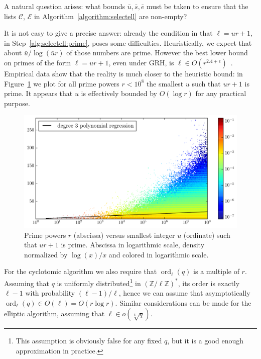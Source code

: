 \documentclass[12pt]{article}
\theoremstyle{plain}
\theoremstyle{definition}
\DeclareMathOperator{\order}{ord} %
\def\Z{\ensuremath{\mathbb{Z}}}
\newcounter{algorithm}
\begin{document}
A natural question arises: what bounds $\bar{u},\bar{s},\bar{e}$ must
be taken to ensure that the lists $\mathcal{C}$, $\mathcal{E}$ in
Algorithm~\ref{algorithm:selectell} are non-empty?

It is not easy to give a precise answer: already the condition in that
$\ell=ur+1$, in Step~\ref{alg:selectell:prime}, poses some
difficulties. Heuristically, we expect that about
$\bar{u}/\log(\bar{u}r)$ of those numbers are prime. However the best
lower bound on primes of the form $\ell=ur+1$, even under GRH, is
$\ell\in O(r^{2.4+\epsilon})$~\cite{heath1992zero}. Empirical data
show that the reality is much closer to the heuristic bound: in
Figure~\ref{fig:primes-arith-prog} we plot for all prime powers
$r<10^8$ the smallest $u$ such that $ur+1$ is prime. It appears that
$u$ is effectively bounded by $O(\log r)$ for any practical purpose.


\begin{figure}
  \centering
  \includegraphics[width=\textwidth]{arith_prog}  
  \caption{Prime powers $r$ (abscissa) versus smallest integer $u$
    (ordinate) such that $ur+1$ is prime. Abscissa in logarithmic
    scale, density normalized by $\log(x)/x$ and colored in
    logarithmic scale.}
  \label{fig:primes-arith-prog}
\end{figure}

For the cyclotomic algorithm we also require that $\order_\ell(q)$ is
a multiple of $r$. Assuming that $q$ is uniformly
distributed\footnote{This assumption is obviously false for any fixed
  $q$, but it is a good enough approximation in practice.} in
$(\Z/\ell\Z)^\ast$, its order is exactly $\ell-1$ with probability
$(\ell-1)/\ell$, hence we can assume that asymptotically
$\order_\ell(q)\in O(\ell)=O(r\log r)$. Similar considerations can be
made for the elliptic algorithm, assuming that $\ell\in
o(\sqrt[4]{q})$.
\end{document}
